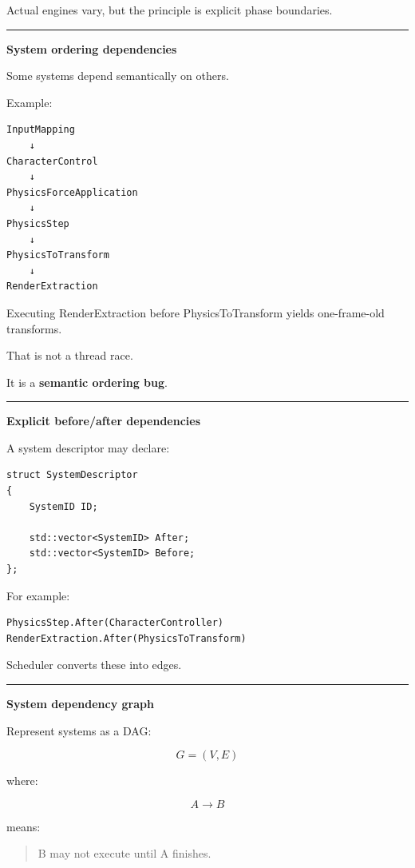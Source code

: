 Actual engines vary, but the principle is explicit phase boundaries.

\begin{center}\rule{0.5\linewidth}{0.5pt}\end{center}

\textbf{System ordering dependencies}

Some systems depend semantically on others.

Example:

\begin{verbatim}
InputMapping
    ↓
CharacterControl
    ↓
PhysicsForceApplication
    ↓
PhysicsStep
    ↓
PhysicsToTransform
    ↓
RenderExtraction
\end{verbatim}

Executing RenderExtraction before PhysicsToTransform yields one-frame-old transforms.

That is not a thread race.

It is a \textbf{semantic ordering bug}.

\begin{center}\rule{0.5\linewidth}{0.5pt}\end{center}

\textbf{Explicit before/after dependencies}

A system descriptor may declare:

\begin{verbatim}
struct SystemDescriptor
{
    SystemID ID;

    std::vector<SystemID> After;
    std::vector<SystemID> Before;
};
\end{verbatim}

For example:

\begin{verbatim}
PhysicsStep.After(CharacterController)
RenderExtraction.After(PhysicsToTransform)
\end{verbatim}

Scheduler converts these into edges.

\begin{center}\rule{0.5\linewidth}{0.5pt}\end{center}

\textbf{System dependency graph}

Represent systems as a DAG:

\[
G=(V,E)
\]

where:

\[
A\rightarrow B
\]

means:

\begin{quote}
B may not execute until A finishes.
\end{quote}

